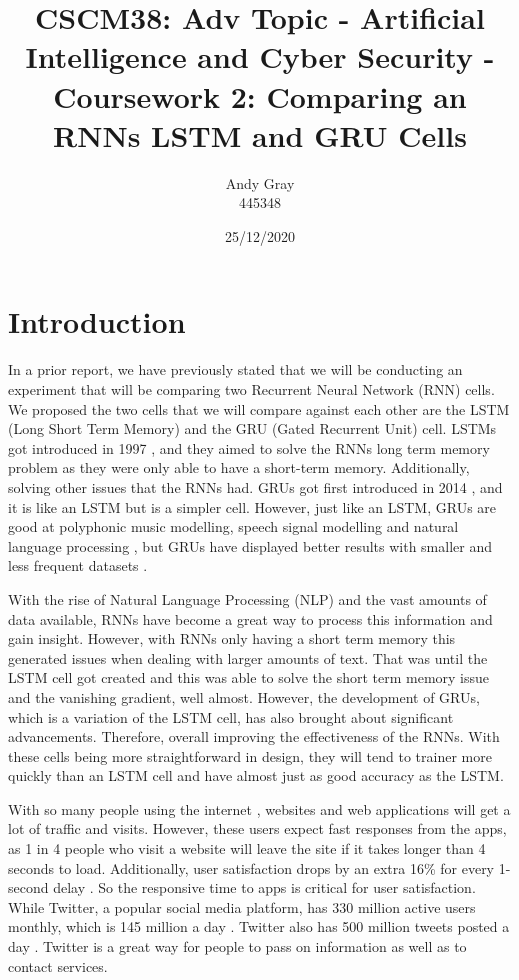 \documentclass[a4paper,10pt]{article}
\begin{document}
\title{CSCM38: Adv Topic - Artificial Intelligence and Cyber Security - Coursework 2: Comparing an RNNs LSTM and GRU Cells}
\author{Andy Gray\\445348}
\date{25/12/2020}

\maketitle

\section{Introduction}
\label{sec:intro}
	In a prior report, we have previously stated that we will be conducting an experiment that will be comparing two Recurrent Neural Network (RNN) cells. We proposed the two cells that we will compare against each other are the LSTM (Long Short Term Memory) and the GRU (Gated Recurrent Unit) cell. LSTMs got introduced in 1997 \cite{hochreiter1997long}, and they aimed to solve the RNNs long term memory problem as they were only able to have a short-term memory. Additionally, solving other issues that the RNNs had. GRUs got first introduced in 2014 \cite{cho2014learning}, and it is like an LSTM but is a simpler cell. However, just like an LSTM, GRUs are good at polyphonic music modelling, speech signal modelling and natural language processing \cite{geron2019hands}, but GRUs have displayed better results with smaller and less frequent datasets \cite{chung2014empirical}.

	With the rise of Natural Language Processing (NLP) and the vast amounts of data available, RNNs have become a great way to process this information and gain insight. However, with RNNs only having a short term memory this generated issues when dealing with larger amounts of text. That was until the LSTM cell got created and this was able to solve the short term memory issue and the vanishing gradient, well almost. However, the development of GRUs, which is a variation of the LSTM cell, has also brought about significant advancements. Therefore, overall improving the effectiveness of the RNNs. With these cells being more straightforward in design, they will tend to trainer more quickly than an LSTM cell and have almost just as good accuracy as the LSTM.  

	With so many people using the internet \cite{internet_facts}, websites and web applications will get a lot of traffic and visits. However, these users expect fast responses from the apps, as 1 in 4 people who visit a website will leave the site if it takes longer than 4 seconds to load. Additionally, user satisfaction drops by an extra 16\% for every 1-second delay \cite{internet_speed}. So the responsive time to apps is critical for user satisfaction. While Twitter, a popular social media platform, has 330 million active users monthly, which is 145 million a day \cite{twitter_facts}.  Twitter also has 500 million tweets posted a day \cite{twitter_facts}. Twitter is a great way for people to pass on information as well as to contact services.
	
\end{document}

